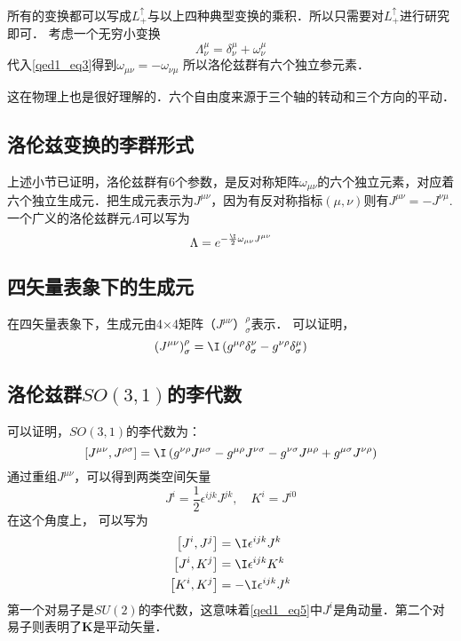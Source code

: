 所有的变换都可以写成$L_{+}^{\uparrow}$与以上四种典型变换的乘积．所以只需要对$L_{+}^{\uparrow}$进行研究即可．
考虑一个无穷小变换
\begin{equation}\Lambda_{\nu}^{\mu}=\delta_{\nu}^{\mu}+\omega_{\nu}^{\mu}\end{equation}
代入\autoref{qed1_eq3}得到$\omega_{\mu \nu}=-\omega_{\nu \mu}$
所以洛伦兹群有六个独立参元素．

这在物理上也是很好理解的．六个自由度来源于三个轴的转动和三个方向的平动．
\subsection{洛伦兹变换的李群形式}
上述小节已证明，洛伦兹群有6个参数，是反对称矩阵$\omega_{\mu\nu}$的六个独立元素，对应着六个独立生成元．把生成元表示为$J^{\mu\nu}$，因为有反对称指标$(\mu,\nu)$则有$J^{\mu\nu}=-J^{\nu\mu}$.一个广义的洛伦兹群元$\Lambda$可以写为
\begin{equation}
\Lambda=e^{-\frac{\I}{2} \omega_{\mu\nu}J^{\mu\nu}}
\end{equation}
\subsection{四矢量表象下的生成元}
在四矢量表象下，生成元由4×4矩阵$（J^{\mu\nu}）_\sigma^\rho$表示．
可以证明，
\begin{equation}\left(J^{\mu \nu}\right)_{\sigma}^{\rho}=\I\left(g^{\mu \rho} \delta_{\sigma}^{\nu}-g^{\nu \rho} \delta_{\sigma}^{\mu}\right)\end{equation}
\subsection{洛伦兹群$SO(3,1)$的李代数}
可以证明，$SO(3,1)$的李代数为：
\begin{equation}\left[J^{\mu \nu}, J^{\rho \sigma}\right]=\I\left(g^{\nu \rho} J^{\mu \sigma}-g^{\mu \rho} J^{\nu \sigma}-g^{\nu \sigma} J^{\mu \rho}+g^{\mu \sigma} J^{\nu \rho}\right)\end{equation}
通过重组$J^{\mu\nu}$，可以得到两类空间矢量
\begin{equation}\label{qed1_eq5}J^{i}=\frac{1}{2} \epsilon^{i j k} J^{j k}, \quad K^{i}=J^{i 0}\end{equation}
在这个角度上， 可以写为
\begin{equation}\begin{aligned}
\left[J^{i}, J^{j}\right] &=\I \epsilon^{i j k} J^{k} \\
\left[J^{i}, K^{j}\right] &=\I \epsilon^{i j k} K^{k} \\
\left[K^{i}, K^{j}\right] &=-\I \epsilon^{i j k} J^{k}
\end{aligned}\end{equation}
第一个对易子是$SU(2)$的李代数，这意味着\autoref{qed1_eq5}中$J^i$是角动量．第二个对易子则表明了\textbf{K}是平动矢量．
